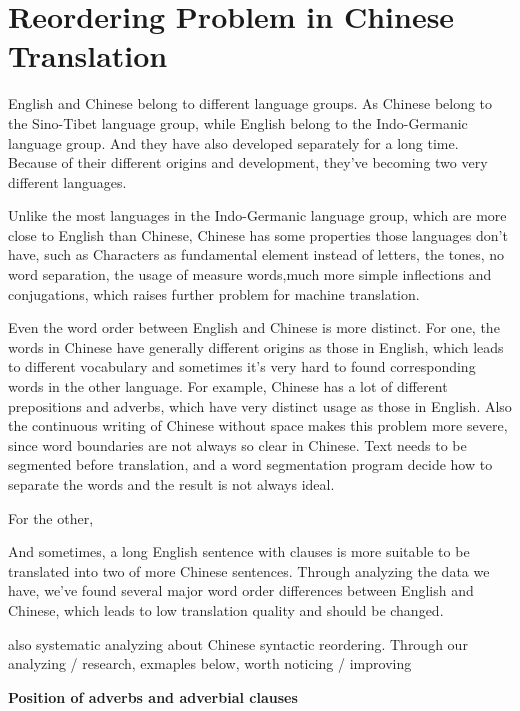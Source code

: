 \section{Reordering Problem in Chinese Translation}
\label{ch:ReorderingApproach:sec:Problem}

English and Chinese belong to different language groups. As Chinese belong to the Sino-Tibet language group, while English belong to the Indo-Germanic language group. And they have also developed separately for a long time. Because of their different origins and development, they've becoming two very different languages.

Unlike the most languages in the Indo-Germanic language group, which are more close to English than Chinese, Chinese has some properties those languages don't have, such as Characters as fundamental element instead of letters, the tones, no word separation, the usage of measure words,much more simple inflections and conjugations, which raises further problem for machine translation.

Even the word order between English and Chinese is more distinct. For one, the words in Chinese have generally different origins as those in English, which leads to different vocabulary and sometimes it's very hard to found corresponding words in the other language. For example, Chinese has a lot of different prepositions and adverbs, which have very distinct usage as those in English. Also the continuous writing of Chinese without space makes this problem more severe, since word boundaries are not always so clear in Chinese. Text needs to be segmented before translation, and a word segmentation program decide how to separate the words and the result is not always ideal.

For the other, 

And sometimes, a long English sentence with clauses is more suitable to be translated into two of more Chinese sentences. Through analyzing the data we have, we've found several major word order differences between English and Chinese, which leads to low translation quality and should be changed. 


\cite{syntactic} also systematic analyzing about Chinese syntactic reordering. Through our analyzing / research, exmaples below, worth noticing / improving

\textbf{Position of adverbs and adverbial clauses}
